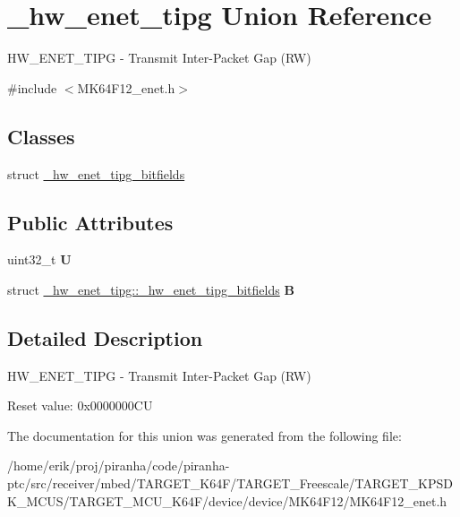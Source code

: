 \hypertarget{union__hw__enet__tipg}{}\section{\+\_\+hw\+\_\+enet\+\_\+tipg Union Reference}
\label{union__hw__enet__tipg}


H\+W\+\_\+\+E\+N\+E\+T\+\_\+\+T\+I\+PG -\/ Transmit Inter-\/\+Packet Gap (RW)  




{\ttfamily \#include $<$M\+K64\+F12\+\_\+enet.\+h$>$}

\subsection*{Classes}
\begin{DoxyCompactItemize}
\item 
struct \hyperlink{struct__hw__enet__tipg_1_1__hw__enet__tipg__bitfields}{\+\_\+hw\+\_\+enet\+\_\+tipg\+\_\+bitfields}
\end{DoxyCompactItemize}
\subsection*{Public Attributes}
\begin{DoxyCompactItemize}
\item 
uint32\+\_\+t {\bfseries U}\hypertarget{union__hw__enet__tipg_a969c75d4ab511b7dcaff466689d1586e}{}\label{union__hw__enet__tipg_a969c75d4ab511b7dcaff466689d1586e}

\item 
struct \hyperlink{struct__hw__enet__tipg_1_1__hw__enet__tipg__bitfields}{\+\_\+hw\+\_\+enet\+\_\+tipg\+::\+\_\+hw\+\_\+enet\+\_\+tipg\+\_\+bitfields} {\bfseries B}\hypertarget{union__hw__enet__tipg_ad7b21dd36dea01cf84e090363dda6e8c}{}\label{union__hw__enet__tipg_ad7b21dd36dea01cf84e090363dda6e8c}

\end{DoxyCompactItemize}


\subsection{Detailed Description}
H\+W\+\_\+\+E\+N\+E\+T\+\_\+\+T\+I\+PG -\/ Transmit Inter-\/\+Packet Gap (RW) 

Reset value\+: 0x0000000\+CU 

The documentation for this union was generated from the following file\+:\begin{DoxyCompactItemize}
\item 
/home/erik/proj/piranha/code/piranha-\/ptc/src/receiver/mbed/\+T\+A\+R\+G\+E\+T\+\_\+\+K64\+F/\+T\+A\+R\+G\+E\+T\+\_\+\+Freescale/\+T\+A\+R\+G\+E\+T\+\_\+\+K\+P\+S\+D\+K\+\_\+\+M\+C\+U\+S/\+T\+A\+R\+G\+E\+T\+\_\+\+M\+C\+U\+\_\+\+K64\+F/device/device/\+M\+K64\+F12/M\+K64\+F12\+\_\+enet.\+h\end{DoxyCompactItemize}

